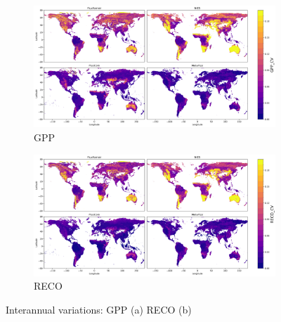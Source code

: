 \begin{figure}[p]
    \centering
    \begin{subfigure}{\textwidth}
      \centering
      \includegraphics[width=\textwidth]{figs/chap6/IAV_GPP.png}
      \caption{GPP}
      \label{fig:chap6_fig8a}
    \end{subfigure}

    \begin{subfigure}{\textwidth}
      \centering
      \includegraphics[width=\textwidth]{figs/chap6/IAV_RECO.png}
      \caption{RECO}
      \label{fig:chap6_fig8b}
    \end{subfigure}
    \caption{Interannual variations: GPP (a) RECO (b)}
    \label{fig:chap6_fig8}
\end{figure}